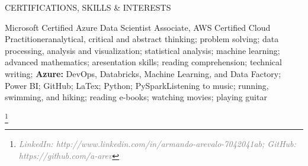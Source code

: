 \documentclass{resume}
\begin{document}
\begin{Section}{CERTIFICATIONS, SKILLS \& INTERESTS}

\begin{csiSection}{Microsoft Certified Azure Data Scientist Associate, AWS Certified Cloud Practitioner}{analytical, critical and abstract thinking; problem solving; data processing, analysis and visualization; statistical analysis; machine learning; advanced mathematics; aresentation skills; reading comprehension; technical writing; \textbf{Azure:} DevOps, Databricks, Machine Learning, and Data Factory; Power BI; GitHub; LaTex; Python; PySpark}{Listening to music; running, swimming, and hiking; reading e-books; watching movies; playing guitar}
\end{csiSection}

\end{Section}


 \let\thefootnote\relax\footnote{\footnotesize \textcolor{gray}{\hfil \textit{LinkedIn: http://www.linkedin.com/in/armando-arevalo-7042041ab; GitHub: https://github.com/a-arev}}} 

\end{document}
